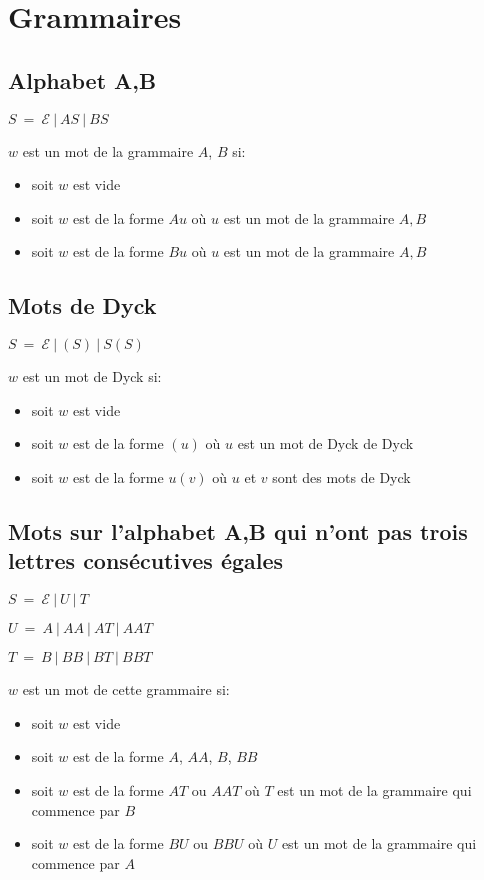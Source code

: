 \documentclass[a4paper, titlepage]{article}
\begin{document}
\section{Grammaires}

\subsection{Alphabet A,B}
\medskip
$ S\ =\ \mathcal{E}\ |\ AS\ |\ BS $ 

$w$ est un mot de la grammaire $A$, $B$ si:
\begin{itemize}
\item soit $w$ est vide
\item soit $w$ est de la forme $Au$ où $u$ est un mot de la grammaire
  $A,B$
\item soit $w$ est de la forme $Bu$ où $u$ est un mot de la grammaire
  $A,B$
\end{itemize}

\subsection{Mots de Dyck}
\medskip
$ S\ =\ \mathcal{E}\ |\ (S)\ |\ S(S) $ 

$w$ est un mot de Dyck si:
\begin{itemize}
\item soit $w$ est vide
\item soit $w$ est de la forme $(u)$ où $u$ est un mot de Dyck
  de Dyck
\item soit $w$ est de la forme $u(v)$ où $u$ et $v$ sont des mots de Dyck
\end{itemize}

\subsection{Mots sur l'alphabet A,B qui n'ont pas trois lettres
  consécutives égales}
\medskip
$ S\ =\ \mathcal{E}\ |\ U\ |\ T $

$ U\ =\ A\ |\ AA\ |\ AT\ |\ AAT$

$ T\ =\ B\ |\ BB\ |\ BT\ |\ BBT$

$w$ est un mot de cette grammaire si:
\begin{itemize}
\item soit $w$ est vide
\item soit $w$ est de la forme $A$, $AA$, $B$, $BB$
\item soit $w$ est de la forme $AT$ ou $AAT$ où $T$ est un mot de la grammaire
  qui commence par $B$
\item soit $w$ est de la forme $BU$ ou $BBU$ où $U$ est un mot de la grammaire
  qui commence par $A$

\end{itemize}
\end{document}
